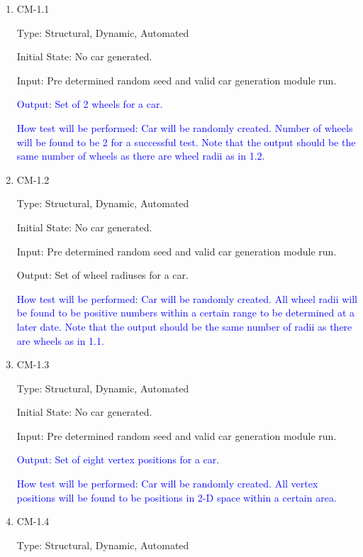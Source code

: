 \documentclass[12pt, titlepage]{article}
\begin{document}
\begin{enumerate}

\item{CM-1.1\\}

Type: Structural, Dynamic, Automated
					
Initial State: No car generated.
					
Input: Pre determined random seed and valid car generation module run.
					
\textcolor{blue}{Output: Set of 2 wheels for a car.}
					
\textcolor{blue}{How test will be performed: Car will be randomly created. 
Number of wheels will 
be found to be 2 for a successful test. Note that the output 
should be the same number of wheels as there are wheel radii as in 1.2.}

\item{CM-1.2\\}

Type: Structural, Dynamic, Automated
					
Initial State: No car generated.
					
Input: Pre determined random seed and valid  car generation module run.
					
Output: Set of wheel radiuses for a car.
					
\textcolor{blue}{How test will be performed: Car will be randomly created. All 
wheel radii
will be found to be positive numbers within a certain range to be determined at 
a later date. Note that the output should be the same number of radii as 
there are wheels as in 1.1.}

\item{CM-1.3\\}

Type: Structural, Dynamic, Automated
					
Initial State: No car generated.
					
Input: Pre determined random seed and valid  car generation module run.
					
\textcolor{blue}{Output: Set of eight vertex positions for a car.}
					
\textcolor{blue}{How test will be performed: Car will be randomly created. All 
vertex positions 
will be found to be positions in 2-D space within a certain area.}

\item{CM-1.4\\}

Type: Structural, Dynamic, Automated
					

\end{enumerate}
\end{document}
